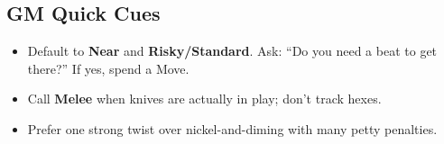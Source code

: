 \subsection{GM Quick Cues}
\begin{itemize}
  \item Default to \textbf{Near} and \textbf{Risky/Standard}. Ask: “Do you need a beat to get there?” If yes, spend a Move.
  \item Call \textbf{Melee} when knives are actually in play; don't track hexes.
  \item Prefer one strong twist over nickel-and-diming with many petty penalties.
\end{itemize}
